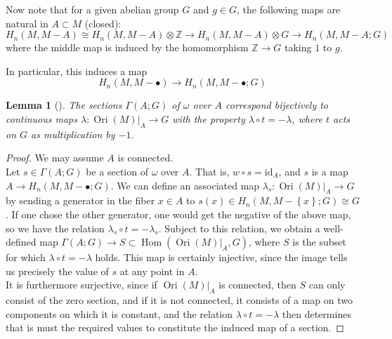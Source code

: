 \documentclass[reqno]{amsart}
\newtheorem{lemma}[theorem]{Lemma}
\theoremstyle{definition}
\theoremstyle{remark}
\DeclareMathOperator{\Hom}{Hom}
\DeclareMathOperator{\Ori}{Ori}
\newcommand{\id}{{\mathrm{id}}}
\begin{document}
Now note that for a given abelian group $G$ and
$g \in G$, the following maps are natural in
$A \subset M$ (closed):
\[
H_n(M, M- A) \cong H_n \left( M, M- A \right) \otimes
\mathbb{Z} \to H_n(M, M-A) \otimes G
\to H_n(M, M-A;G)
\] 
where the middle map is induced by the homomorphism
$\mathbb{Z} \to G$ taking $1$ to $g$.

In particular, this induces a map
\[
H_n(M, M - \bullet) \to 
H_n(M, M - \bullet; G)
\] 

\begin{lemma}[]\label{Lemma:X2948JJD}
    The sections $\Gamma (A;G)$ of $\omega$ over
    $A$ correspond bijectively to continuous maps
    $\lambda \colon \Ori \left( M \right)|_{A} \to G$ with
    the property $\lambda \circ t = - \lambda$, where
    $t$ acts on $G$ as multiplication by $-1$.
\end{lemma}

\begin{proof}
    We may assume $A$ is connected.\\
    Let $s \in \Gamma \left( A;G \right) $ be a section
    of $\omega$ over $A$. That is, 
    $w \circ s = \id_A$, and
    $s$ is a map $A \to H_n (M, M - \bullet;G)$. We
    can define an associated map
    $\lambda_s \colon \Ori (M)|_{A} \to G$ by
    sending a generator in the fiber $x \in A$ to
    $s(x) \in 
    H_n \left( M, M - \left\{ x \right\} ;G \right) 
    \cong G$. If one chose the other generator, one
    would get the negative of the above map, so
    we have the relation
    $\lambda_s \circ t = - \lambda_s$. Subject to this relation,
    we obtain a well-defined map
    $\Gamma \left( A;G \right) \to 
    S \subset \Hom \left( \Ori \left( M \right) |_A , G \right) $,
    where $S$ is the subset for which
    $\lambda \circ t = - \lambda$ holds.
    This map is certainly injective, since
    the image tells us precisely the value of
    $s$ at any point in $A$.\\
    It is furthermore surjective, since if
    $\Ori(M)|_A$ is connected, then 
    $S$ can only consist of the zero section, and
    if it is not connected, it consists of a map on two
    components on which it is constant, and the
    relation $\lambda \circ t = - \lambda$ then
    determines that is must the required values
    to constitute the induced map of a section.
\end{proof}
\end{document}
